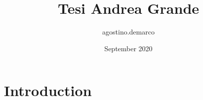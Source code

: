 \documentclass{article}
\title{Tesi Andrea Grande}
\author{agostino.demarco}
\date{September 2020}
\begin{document}
\maketitle

\section{Introduction}
\end{document}
